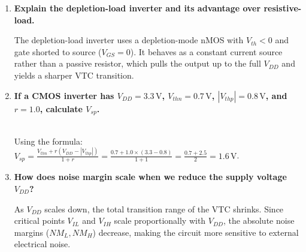 \documentclass[12pt,a4paper]{article}
\newcommand{\Q}[1]{\textbf{#1}\par\noindent\ignorespaces}
\begin{document}
\begin{tcolorbox}[exambox, title={\textbf{Frequently Asked / Viva Questions}}]
\begin{enumerate}[topsep=0pt, label=\textbf{Q\arabic*.}, itemsep=5pt]
    In an enhancement-load nMOS inverter, the load transistor turns OFF when the output rises to $V_{DD} - V_{thn}$ because its gate-source voltage drops below the threshold voltage. Thus, it cannot pull the output all the way up to $V_{DD}$.
  \item \Q{Explain the depletion-load inverter and its advantage over resistive-load.}
    The depletion-load inverter uses a depletion-mode nMOS with $V_{th} < 0$ and gate shorted to source ($V_{GS}=0$). It behaves as a constant current source rather than a passive resistor, which pulls the output up to the full $V_{DD}$ and yields a sharper VTC transition.
  \item \Q{If a CMOS inverter has $V_{DD} = 3.3\,\text{V}$, $V_{thn} = 0.7\,\text{V}$, $|V_{thp}| = 0.8\,\text{V}$, and $r = 1.0$, calculate $V_{sp}$.}\\
    Using the formula: $V_{sp} = \frac{V_{thn} + r(V_{DD} - |V_{thp}|)}{1+r} = \frac{0.7 + 1.0 \times (3.3 - 0.8)}{1 + 1} = \frac{0.7 + 2.5}{2} = 1.6\,\text{V}$.
  \item \Q{How does noise margin scale when we reduce the supply voltage $V_{DD}$?}
    As $V_{DD}$ scales down, the total transition range of the VTC shrinks. Since critical points $V_{IL}$ and $V_{IH}$ scale proportionally with $V_{DD}$, the absolute noise margins ($NM_L, NM_H$) decrease, making the circuit more sensitive to external electrical noise.
\end{enumerate}
\end{tcolorbox}
\end{document}
